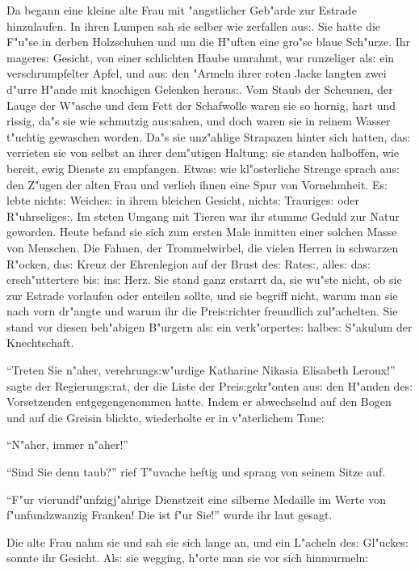 \documentclass[oneside,12pt]{book}
\newcommand{\s}{s:}%
\begin{document}
Da begann eine kleine alte Frau mit "angstlicher Geb"arde zur
Estrade hinzulaufen. In ihren Lumpen sah sie selber wie zerfallen
au{\s}. Sie hatte die F"u"se in derben Holzschuhen und um die
H"uften eine gro"se blaue Sch"urze. Ihr magere{\s} Gesicht, von
einer schlichten Haube umrahmt, war runzeliger al{\s} ein
verschrumpfelter Apfel, und au{\s} den "Armeln ihrer roten Jacke
langten zwei d"urre H"ande mit knochigen Gelenken herau{\s}. Vom
Staub der Scheunen, der Lauge der W"asche und dem Fett der
Schafwolle waren sie so hornig, hart und rissig, da"s sie wie
schmutzig au{\s}sahen, und doch waren sie in reinem Wasser
t"uchtig gewaschen worden. Da"s sie unz"ahlige Strapazen hinter
sich hatten, da{\s} verrieten sie von selbst an ihrer dem"utigen
Haltung: sie standen halboffen, wie bereit, ewig Dienste zu
empfangen. Etwa{\s} wie kl"osterliche Strenge sprach au{\s} den
Z"ugen der alten Frau und verlieh ihnen eine Spur von Vornehmheit.
E{\s} lebte nicht{\s} Weiche{\s} in ihrem bleichen Gesicht,
nicht{\s} Traurige{\s} oder R"uhrselige{\s}. Im steten Umgang mit
Tieren war ihr stumme Geduld zur Natur geworden. Heute befand sie
sich zum ersten Male inmitten einer solchen Masse von Menschen.
Die Fahnen, der Trommelwirbel, die vielen Herren in schwarzen
R"ocken, da{\s} Kreuz der Ehrenlegion auf der Brust de{\s}
Rate{\s}, alle{\s} da{\s} ersch"uttertere bi{\s} in{\s} Herz. Sie
stand ganz erstarrt da, sie wu"ste nicht, ob sie zur Estrade
vorlaufen oder enteilen sollte, und sie begriff nicht, warum man
sie nach vorn dr"angte und warum ihr die Prei{\s}richter
freundlich zul"achelten. Sie stand vor diesen beh"abigen B"urgern
al{\s} ein verk"orperte{\s} halbe{\s} S"akulum der Knechtschaft.

"`Treten Sie n"aher, verehrung{\s}w"urdige Katharine Nikasia
Elisabeth Leroux!"' sagte der Regierung{\s}rat, der die Liste der
Prei{\s}gekr"onten au{\s} den H"anden de{\s} Vorsetzenden
entgegengenommen hatte. Indem er abwechselnd auf den Bogen und auf
die Greisin blickte, wiederholte er in v"aterlichem Tone:

"`N"aher, immer n"aher!"'

"`Sind Sie denn taub?"' rief T"uvache heftig und sprang von seinem
Sitze auf.

"`F"ur vierundf"unfzigj"ahrige Dienst\/zeit eine silberne Medaille
im Werte von f"unfundzwanzig Franken! Die ist f"ur Sie!"' wurde
ihr laut gesagt.

Die alte Frau nahm sie und sah sie sich lange an, und ein L"acheln
de{\s} Gl"ucke{\s} sonnte ihr Gesicht. Al{\s} sie wegging, h"orte
man sie vor sich hinmurmeln:
\end{document}
